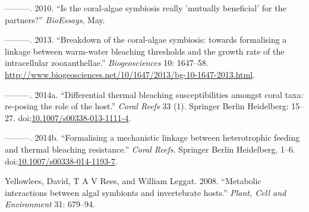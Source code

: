 \documentclass[]{elsarticle} %
\begin{document}
\hypertarget{ref-Wooldridge:2010p7809}{}
---------. 2010. ``Is the coral-algae symbiosis really 'mutually
beneficial' for the partners?'' \emph{BioEssays}, May.

\hypertarget{ref-Wooldridge:2013tj}{}
---------. 2013. ``Breakdown of the coral-algae symbiosis: towards
formalising a linkage between warm-water bleaching thresholds and the
growth rate of the intracellular zooxanthellae.'' \emph{Biogeosciences}
10: 1647--58.
\url{http://www.biogeosciences.net/10/1647/2013/bg-10-1647-2013.html}.

\hypertarget{ref-Wooldridge:2014di}{}
---------. 2014a. ``Differential thermal bleaching susceptibilities
amongst coral taxa: re-posing the role of the host.'' \emph{Coral Reefs}
33 (1). Springer Berlin Heidelberg: 15--27.
doi:\href{https://doi.org/10.1007/s00338-013-1111-4}{10.1007/s00338-013-1111-4}.

\hypertarget{ref-Wooldridge:2014hc}{}
---------. 2014b. ``Formalising a mechanistic linkage between
heterotrophic feeding and thermal bleaching resistance.'' \emph{Coral
Reefs}. Springer Berlin Heidelberg, 1--6.
doi:\href{https://doi.org/10.1007/s00338-014-1193-7}{10.1007/s00338-014-1193-7}.

\hypertarget{ref-Yellowlees:2008p331}{}
Yellowlees, David, T A V Rees, and William Leggat. 2008. ``Metabolic
interactions between algal symbionts and invertebrate hosts.''
\emph{Plant, Cell and Environment} 31: 679--94.
\end{document}
